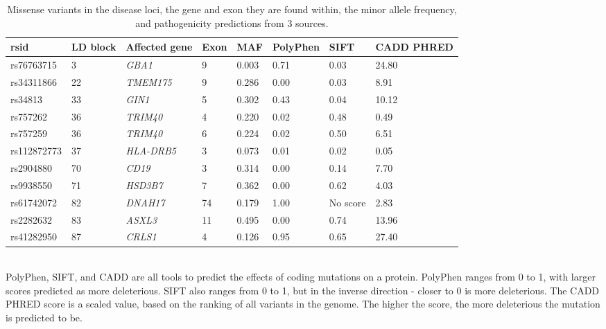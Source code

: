 \documentclass{article}
\begin{document}
\begin{table}[h]
\centering
\caption{Missense variants in the disease loci, the gene and exon they are found within, the minor allele frequency, and pathogenicity predictions from 3 sources.}
\label{tab:codingvariants}
\begin{tabular}{|l|l|l|l|l|l|l|l|}
\hline
rsid        & LD block & Affected gene & Exon & MAF   & PolyPhen & SIFT     & CADD PHRED \\ \hline
rs76763715  & 3        & \textit{GBA1}           & 9    & 0.003 & 0.71     & 0.03     & 24.80 \\ \hline
rs34311866  & 22       & \textit{TMEM175}       & 9    & 0.286 & 0.00     & 0.03     & 8.91  \\ \hline
rs34813     & 33       & \textit{GIN1}          & 5    & 0.302 & 0.43     & 0.04     & 10.12 \\ \hline
rs757262    & 36       & \textit{TRIM40}        & 4    & 0.220 & 0.02     & 0.48     & 0.49  \\ \hline
rs757259    & 36       & \textit{TRIM40}        & 6    & 0.224 & 0.02     & 0.50     & 6.51  \\ \hline
rs112872773 & 37       & \textit{HLA-DRB5}      & 3    & 0.073 & 0.01     & 0.02     & 0.05  \\ \hline
rs2904880   & 70       & \textit{CD19}         & 3    & 0.314 & 0.00     & 0.14     & 7.70  \\ \hline
rs9938550   & 71       & \textit{HSD3B7}        & 7    & 0.362 & 0.00     & 0.62     & 4.03  \\ \hline
rs61742072  & 82       & \textit{DNAH17}        & 74   & 0.179 & 1.00     & No score & 2.83  \\ \hline
rs2282632   & 83       & \textit{ASXL3}         & 11   & 0.495 & 0.00     & 0.74     & 13.96 \\ \hline
rs41282950  & 87       & \textit{CRLS1}         & 4    & 0.126 & 0.95     & 0.65     & 27.40 \\ \hline
\end{tabular}
\end{table}
\\PolyPhen\cite{Adzhubei2010AMutations}, SIFT\cite{Ng2001PredictingSubstitutions}, and CADD\cite{Schubach2024CADDPredictions} are all tools to predict the effects of coding mutations on a protein. PolyPhen ranges from 0 to 1, with larger scores predicted as more deleterious. SIFT also ranges from 0 to 1, but in the inverse direction - closer to 0 is more deleterious. The CADD PHRED score is a scaled value, based on the ranking of all variants in the genome. The higher the score, the more deleterious the mutation is predicted to be.
\end{document}

